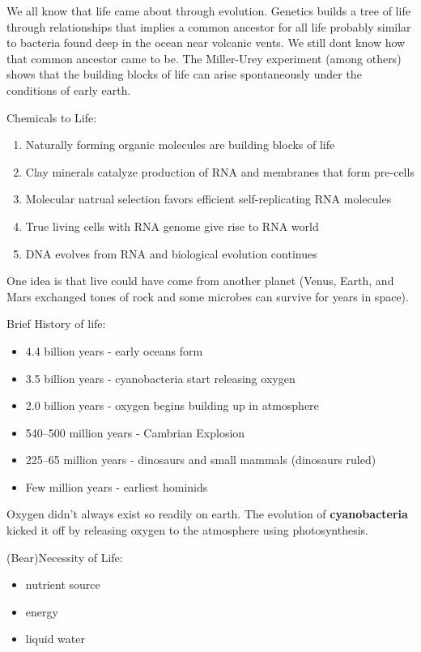 \documentclass[12pt]{article}
\begin{document}
We all know that life came about through evolution. Genetics builds a tree of life through relationships that implies a common ancestor for all life probably similar to bacteria found deep in the ocean near volcanic vents. We still dont know how that common ancestor came to be. The Miller-Urey experiment (among others) shows that the building blocks of life can arise spontaneously under the conditions of early earth.

Chemicals to Life:
\begin{enumerate}
\item Naturally forming organic molecules are building blocks of life
\item Clay minerals catalyze production of RNA and membranes that form pre-cells
\item Molecular natrual selection favors efficient self-replicating RNA molecules
\item True living cells with RNA genome give rise to RNA world
\item DNA evolves from RNA and biological evolution continues
\end{enumerate}

One idea is that live could have come from another planet (Venus, Earth, and Mars exchanged tones of rock and some microbes can survive for years in space).

Brief History of life:
\begin{itemize}
\item 4.4 billion years - early oceans form
\item 3.5 billion years - cyanobacteria start releasing oxygen
\item 2.0 billion years - oxygen begins building up in atmosphere
\item 540–500 million years - Cambrian Explosion
\item 225–65 million years - dinosaurs and small mammals (dinosaurs ruled)
\item Few million years - earliest hominids
\end{itemize}

Oxygen didn't always exist so readily on earth. The evolution of \textbf{cyanobacteria} kicked it off by releasing oxygen to the atmosphere using photosynthesis.

(Bear)Necessity of Life:
\begin{itemize}
\item nutrient source
\item energy
\item liquid water
\end{itemize}
\end{document}
